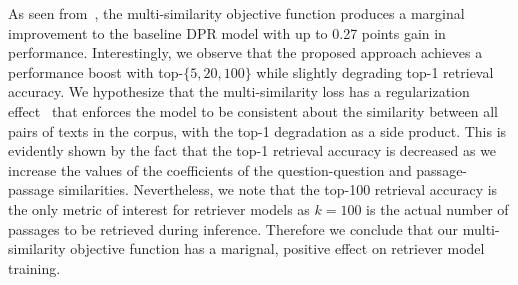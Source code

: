 %
As seen from~, the multi-similarity objective function produces a marginal improvement to the baseline DPR model with up to 0.27 points gain in performance.
%
Interestingly, we observe that the proposed approach achieves a performance boost with top-$\{5, 20, 100\}$ while slightly degrading top-1 retrieval accuracy.
%
We hypothesize that the multi-similarity loss has a regularization effect~\cite{ioffe2015batch} that enforces the model to be consistent about the similarity between all pairs of texts in the corpus, with the top-1 degradation as a side product.
%
This is evidently shown by the fact that the top-1 retrieval accuracy is decreased as we increase the values of the coefficients of the question-question and passage-passage similarities.
%
Nevertheless, we note that the top-100 retrieval accuracy is the only metric of interest for retriever models as $k=100$ is the actual number of passages to be retrieved during inference.
%
Therefore we conclude that our multi-similarity objective function has a marignal, positive effect on retriever model training.